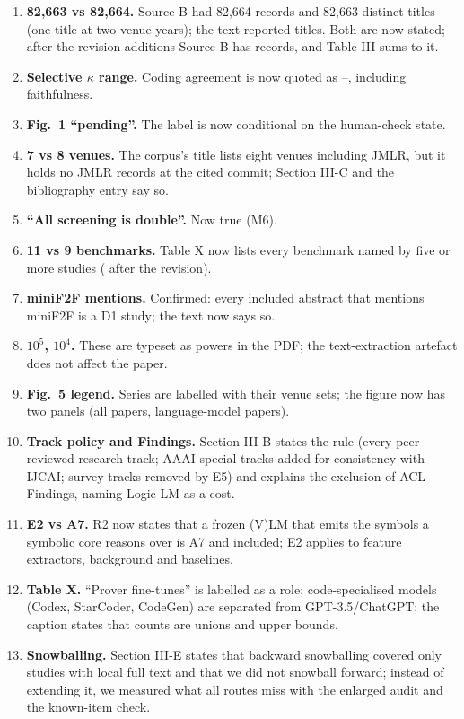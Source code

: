 \documentclass[10pt,a4paper]{article}
\begin{document}
\begin{enumerate}
  \item \textbf{82,663 vs 82,664.} Source B had 82,664 records and 82,663 distinct titles (one title at two venue-years); the text reported titles. Both are now stated; after the revision additions Source B has  records, and Table III sums to it.
  \item \textbf{Selective $\kappa$ range.} Coding agreement is now quoted as --, including faithfulness.
  \item \textbf{Fig.~1 ``pending''.} The label is now conditional on the human-check state.
  \item \textbf{7 vs 8 venues.} The corpus's title lists eight venues including JMLR, but it holds no JMLR records at the cited commit; Section III-C and the bibliography entry say so.
  \item \textbf{``All screening is double''.} Now true (M6).
  \item \textbf{11 vs 9 benchmarks.} Table X now lists every benchmark named by five or more studies ( after the revision).
  \item \textbf{miniF2F mentions.} Confirmed: every included abstract that mentions miniF2F is a D1 study; the text now says so.
  \item \textbf{$10^5$, $10^4$.} These are typeset as powers in the PDF; the text-extraction artefact does not affect the paper.
  \item \textbf{Fig.~5 legend.} Series are labelled with their venue sets; the figure now has two panels (all papers, language-model papers).
  \item \textbf{Track policy and Findings.} Section III-B states the rule (every peer-reviewed research track; AAAI special tracks added for consistency with IJCAI; survey tracks removed by E5) and explains the exclusion of ACL Findings, naming Logic-LM as a cost.
  \item \textbf{E2 vs A7.} R2 now states that a frozen (V)LM that emits the symbols a symbolic core reasons over is A7 and included; E2 applies to feature extractors, background and baselines.
  \item \textbf{Table X.} ``Prover fine-tunes'' is labelled as a role; code-specialised models (Codex, StarCoder, CodeGen) are separated from GPT-3.5/ChatGPT; the caption states that counts are unions and upper bounds.
  \item \textbf{Snowballing.} Section III-E states that backward snowballing covered only studies with local full text and that we did not snowball forward; instead of extending it, we measured what all routes miss with the enlarged audit and the known-item check.
\end{enumerate}
\end{document}
